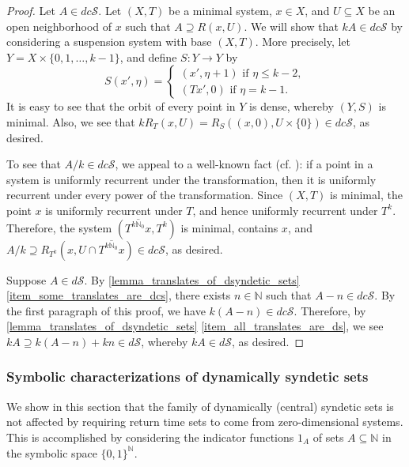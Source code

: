 \documentclass[letter,11pt]{article}
\theoremstyle{plain}
\theoremstyle{definition}
\theoremstyle{plain}
\theoremstyle{plain}
\numberwithin{equation}{section}
\newcommand{\N}{\mathbb{N}}
\renewcommand{\leq}{\leqslant}
\newcommand{\dsyndetic}{d\mathcal{S}}
\newcommand{\dcsyndetic}{dc\mathcal{S}}
\begin{document}
\begin{proof}
    Let $A \in \dcsyndetic$. Let $(X, T)$ be a minimal system, $x \in X$, and $U \subseteq X$ be an open neighborhood of $x$ such that $A \supseteq R(x, U)$. We will show that $k A \in \dcsyndetic$ by considering a suspension system with base $(X, T)$. More precisely, let $Y = X \times \{0, 1, \ldots, k - 1\}$, and define $S: Y \to Y$ by 
    \[
        S(x', \eta) = \begin{cases} (x', \eta + 1) \text{ if } \eta \leq k - 2, \\
        (Tx', 0) \text{ if } \eta = k - 1.
        \end{cases}
    \]
    It is easy to see that the orbit of every point in $Y$ is dense, whereby $(Y, S)$ is minimal.  Also, we see that $k R_T(x, U) = R_S ((x, 0), U \times \{0\}) \in \dcsyndetic$, as desired.

    To see that $A/k \in \dcsyndetic$, we appeal to a well-known fact (cf. \cite[Cor. 3.2]{Ye-D_function}): if a point in a system is uniformly recurrent under the transformation, then it is uniformly recurrent under every power of the transformation.  Since $(X,T)$ is minimal, the point $x$ is uniformly recurrent under $T$, and hence uniformly recurrent under $T^k$.  Therefore, the system $(\overline{T^{k \N_0} x}, T^k)$ is minimal, contains $x$, and $A/k \supseteq R_{T^k}(x, U \cap \overline{T^{k \N_0} x}) \in \dcsyndetic$, as desired.
    
    Suppose $A \in \dsyndetic$. By \cref{lemma_translates_of_dsyndetic_sets} \eqref{item_some_translates_are_dcs}, there exists $n \in \N$ such that $A - n \in \dcsyndetic$. By the first paragraph of this proof, we have $k(A - n) \in \dcsyndetic$. Therefore, by \cref{lemma_translates_of_dsyndetic_sets} \eqref{item_all_translates_are_ds}, we see $k A \supseteq k(A - n) + kn \in \dsyndetic$, whereby $kA \in \dsyndetic$, as desired.
\end{proof}

\subsubsection{Symbolic characterizations of dynamically syndetic sets}

We show in this section that the family of dynamically (central) syndetic sets is not affected by requiring return time sets to come from zero-dimensional systems.  This is accomplished by considering the indicator functions $1_A$ of sets $A \subseteq \N$ in the symbolic space $\{0,1\}^{\N}$.
\end{document}
